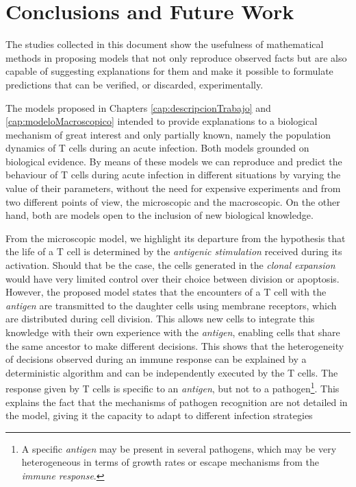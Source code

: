 \chapter{Conclusions and Future Work}
\label{cap:conclusions}

The studies collected in this document show the usefulness of mathematical methods in proposing models that not only reproduce observed facts but are also capable of suggesting explanations for them and make it possible to formulate predictions that can be verified, or discarded, experimentally. 


The models proposed in Chapters \ref{cap:descripcionTrabajo} and \ref{cap:modeloMacroscopico} intended to provide explanations to a biological mechanism of great interest and only partially known, namely the population dynamics of T cells during an acute infection. Both models grounded on biological evidence. By means of these models we can reproduce and predict the behaviour of T cells during acute infection in different situations by varying the value of their parameters, without the need for expensive experiments and from two different points of view, the microscopic and the macroscopic. On the other hand, both are models open to the inclusion of new biological knowledge. 


From the microscopic model, we highlight its departure from the hypothesis that the life of a T cell is determined by the \textit{antigenic stimulation} received during its activation. Should that be the case, the cells generated in the \textit{clonal expansion} would have very limited control over their choice between division or apoptosis. However, the proposed model states that the encounters of a T cell with the \textit{antigen} are transmitted to the daughter cells using membrane receptors, which are distributed during cell division. This allows new cells to integrate this knowledge with their own experience with the \textit{antigen}, enabling cells that share the same ancestor to make different decisions. This shows that the heterogeneity of decisions observed during an immune response can be explained by a deterministic algorithm and can be independently executed by the T cells. The response given by T cells is specific to an \textit{antigen}, but not to a pathogen\footnote{A specific \textit{antigen} may be present in several pathogens, which may be very heterogeneous in terms of growth rates or escape mechanisms from the \textit{immune response}.}. This explains the fact that the mechanisms of pathogen recognition are not detailed in the model, giving it the capacity to adapt to different infection strategies \citep{JTB}


